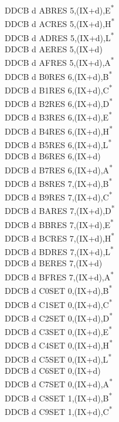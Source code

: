 \documentclass[twoside,openright,a4paper]{book}
\begin{document}
\begin{multicols}{3}
{\begin{tabbing}
	DDCB d AB\>RES 5,(IX+d),E\textsuperscript{*}\\
	DDCB d AC\>RES 5,(IX+d),H\textsuperscript{*}\\
	DDCB d AD\>RES 5,(IX+d),L\textsuperscript{*}\\
	DDCB d AE\>RES 5,(IX+d)\\
	DDCB d AF\>RES 5,(IX+d),A\textsuperscript{*}\\
	DDCB d B0\>RES 6,(IX+d),B\textsuperscript{*}\\
	DDCB d B1\>RES 6,(IX+d),C\textsuperscript{*}\\
	DDCB d B2\>RES 6,(IX+d),D\textsuperscript{*}\\
	DDCB d B3\>RES 6,(IX+d),E\textsuperscript{*}\\
	DDCB d B4\>RES 6,(IX+d),H\textsuperscript{*}\\
	DDCB d B5\>RES 6,(IX+d),L\textsuperscript{*}\\
	DDCB d B6\>RES 6,(IX+d)\\
	DDCB d B7\>RES 6,(IX+d),A\textsuperscript{*}\\
	DDCB d B8\>RES 7,(IX+d),B\textsuperscript{*}\\
	DDCB d B9\>RES 7,(IX+d),C\textsuperscript{*}\\
	DDCB d BA\>RES 7,(IX+d),D\textsuperscript{*}\\
	DDCB d BB\>RES 7,(IX+d),E\textsuperscript{*}\\
	DDCB d BC\>RES 7,(IX+d),H\textsuperscript{*}\\
	DDCB d BD\>RES 7,(IX+d),L\textsuperscript{*}\\
	DDCB d BE\>RES 7,(IX+d)\\
	DDCB d BF\>RES 7,(IX+d),A\textsuperscript{*}\\
	DDCB d C0\>SET 0,(IX+d),B\textsuperscript{*}\\
	DDCB d C1\>SET 0,(IX+d),C\textsuperscript{*}\\
	DDCB d C2\>SET 0,(IX+d),D\textsuperscript{*}\\
	DDCB d C3\>SET 0,(IX+d),E\textsuperscript{*}\\
	DDCB d C4\>SET 0,(IX+d),H\textsuperscript{*}\\
	DDCB d C5\>SET 0,(IX+d),L\textsuperscript{*}\\
	DDCB d C6\>SET 0,(IX+d)\\
	DDCB d C7\>SET 0,(IX+d),A\textsuperscript{*}\\
	DDCB d C8\>SET 1,(IX+d),B\textsuperscript{*}\\
	DDCB d C9\>SET 1,(IX+d),C\textsuperscript{*}\\

\end{tabbing}}
\end{multicols}
\end{document}
